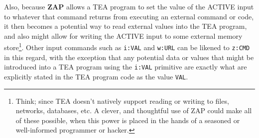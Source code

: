 \documentclass[a4paper, 18pt]{book} %
\begin{document}
{{{Also, because \textbf{ZAP} allows a TEA program to set the value of the ACTIVE input to whatever that command returns from executing an external command or code, it then becomes a potential way to read external values into the TEA program, and also might allow for writing the ACTIVE input to some external memory store\footnote{Think; since TEA doesn't natively support reading or writing to files, networks, databases, etc. A clever, and thoughtful use of ZAP could make all of these possible, when this power is placed in the hands of a seasoned or well-informed programmer or hacker.}. Other input commands such as \texttt{i:VAL} and \texttt{w:URL} can be likened to \texttt{z:CMD} in this regard, with the exception that any potential data or values that might be introduced into a TEA program using the \texttt{i:VAL} primitive are exactly what are explicitly stated in the TEA program code as the value \texttt{VAL}.

\vspace{2em}


}}}
\end{document}
